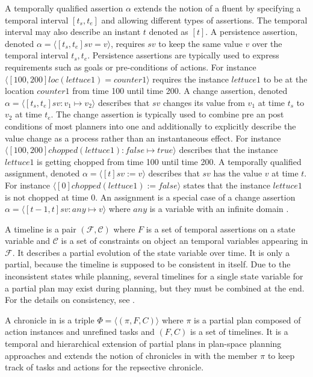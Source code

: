 A temporally qualified assertion $\alpha$ extends the notion of a fluent by specifying a temporal interval $[t_s,t_e]$ and allowing different types of assertions.
The temporal interval may also describe an instant $t$ denoted as $[t]$.
A persistence assertion, denoted $\alpha = \langle [t_s,t_e] sv=v \rangle$, requires $sv$ to keep the same value $v$ over the temporal interval $t_s,t_e$.
Persistence assertions are typically used to express requirements such as goals or pre-conditions of actions.
For instance $\langle[100,200] loc(lettuce1) = counter1\rangle$ requires the instance $lettuce1$ to be at the location $counter1$ from time 100 until time 200.
A change assertion, denoted $\alpha = \langle [t_s,t_e] sv : v_1 \mapsto v_2 \rangle$ describes that $sv$ changes its value from $v_1$ at time $t_s$ to $v_2$ at time $t_e$.
The change assertion is typically used to combine pre an post conditions of most planners into one and additionally to explicitly describe the value change as a process rather than an instantaneous effect.
For instance $\langle [100,200] chopped(lettuce1) : false \mapsto true \rangle$ describes that the instance $lettuce1$ is getting chopped from time 100 until time 200.
A temporally qualified assignment, denoted $\alpha = \langle [t] sv := v \rangle$ describes that $sv$ has the value $v$ at time $t$.
For instance $\langle [0] chopped(lettuce1) := false \rangle$ states that the instance $lettuce1$ is not chopped at time 0.
An assignment is a special case of a change assertion $\alpha = \langle [t-1,t] sv : any \mapsto v \rangle$ where $any$ is a variable with an infinite domain .

A timeline is a pair $(\mathcal{F},\mathcal{C})$ where $F$ is a set of temporal assertions on a state variable and $\mathcal{C}$ is a set of constraints on object an temporal variables appearing in $\mathcal{F}$.
It describes a partial evolution of the state variable over time.
It is only a partial, because the timeline is supposed to be consistent in itself.
Due to the inconsistent states while planning, several timelines for a single state variable for a partial plan may exist during planning, but they must be combined at the end.
For the details on consistency, see \cite{bit-monnotTemporalHierarchicalModels2017}.

A chronicle in \cite{bit-monnotFAPEConstraintbasedPlanner2020} is a triple $\Phi = \langle(\pi,F,C)\rangle$ where $\pi$ is a partial plan composed of action instances and unrefined tasks and $(F,C)$ is a set of timelines.
It is a temporal and hierarchical extension of partial plans in plan-space planning approaches \citep[chap.~5]{ghallabAutomatedPlanningTheory2004} and extends the notion of chronicles in \cite[sec.~4.2.4]{ghallabAutomatedPlanningActing2016} with the member $\pi$ to keep track of tasks and actions for the repsective chronicle.

